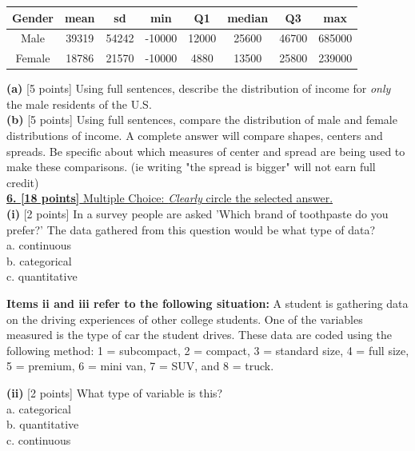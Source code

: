 \documentclass[11pt]{isuthesis}\usepackage[]{graphicx}\usepackage[]{color}
\newenvironment{knitrout}{}{} %
\begin{document}
\begin{appendices}
\begin{knitrout}
\end{knitrout}
\begin{table}[H]\centering 
\begin{tabular}{ |c||c|c||c|c|c|c|c|}
  \hline                        
Gender  & mean & sd & min & Q1 & median & Q3 & max \\
 \hline
 Male & 39319 & 54242 & -10000 & 12000 & 25600 & 46700 & 685000 \\
 Female & 18786 & 21570 & -10000 & 4880 & 13500 & 25800 & 239000 \\
  \hline
\end{tabular}
\end{table}
\noindent\textbf{(a)} [5 points] Using full sentences, describe the distribution of income for \textit{only} the male residents of the U.S.  \\
\noindent\textbf{(b)} [5 points] Using full sentences, compare the distribution of male and female distributions of income. A complete answer will compare shapes, centers and spreads. Be specific about which measures of center and spread are being used to make these comparisons. (ie writing "the spread is bigger" will not earn full credit)  \\


\underline{\textbf{6. [18 points]} Multiple Choice: \textit{Clearly} circle the selected answer.}\\
\noindent\textbf{(i)} [2 points] In a survey people are asked 'Which brand of toothpaste do you prefer?' The data gathered from this question would be what type of data? \\
\indent a. continuous \\
\indent b. categorical \\
\indent c. quantitative 

\textbf{Items ii and iii refer to the following situation:}
A student is gathering data on the driving experiences of other college students. One of the variables measured is the type of car the student drives. These data are coded using the following method: 1 = subcompact, 2 = compact, 3 = standard size, 4 = full size, 5 = premium, 6 = mini van, 7 = SUV, and 8 = truck.

\noindent\textbf{(ii)} [2 points] What type of variable is this? \\
\indent a. categorical \\
\indent b. quantitative \\
\indent c. continuous 


\end{appendices}
\end{document}
